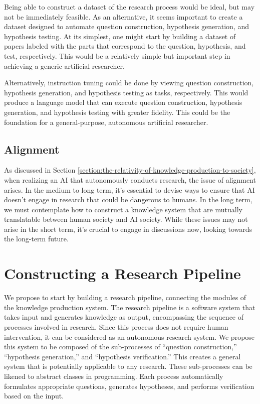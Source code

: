 Being able to construct a dataset of the research process would be ideal, but may not be immediately feasible. As an alternative, it seems important to create a dataset designed to automate question construction, hypothesis generation, and hypothesis testing. At its simplest, one might start by building a dataset of papers labeled with the parts that correspond to the question, hypothesis, and test, respectively. This would be a relatively simple but important step in achieving a generic artificial researcher.

Alternatively, instruction tuning could be done by viewing question construction, hypothesis generation, and hypothesis testing as tasks, respectively. This would produce a language model that can execute question construction, hypothesis generation, and hypothesis testing with greater fidelity. This could be the foundation for a general-purpose, autonomous artificial researcher.



\subsection{Alignment}
As discussed in Section \ref{section:the-relativity-of-knowledge-production-to-society}, when realizing an AI that autonomously conducts research, the issue of alignment arises. In the medium to long term, it's essential to devise ways to ensure that AI doesn't engage in research that could be dangerous to humans. In the long term, we must contemplate how to construct a knowledge system that are mutually translatable between human society and AI society. While these issues may not arise in the short term, it's crucial to engage in discussions now, looking towards the long-term future.

\section{Constructing a Research Pipeline}
We propose to start by building a research pipeline, connecting the modules of the knowledge production system. The research pipeline is a software system that takes input and generates knowledge as output, encompassing the sequence of processes involved in research. Since this process does not require human intervention, it can be considered as an autonomous research system. We propose this system to be composed of the sub-processes of ``question construction,'' ``hypothesis generation,'' and ``hypothesis verification.'' This creates a general system that is potentially applicable to any research. These sub-processes can be likened to abstract classes in programming. Each process automatically formulates appropriate questions, generates hypotheses, and performs verification based on the input. 

